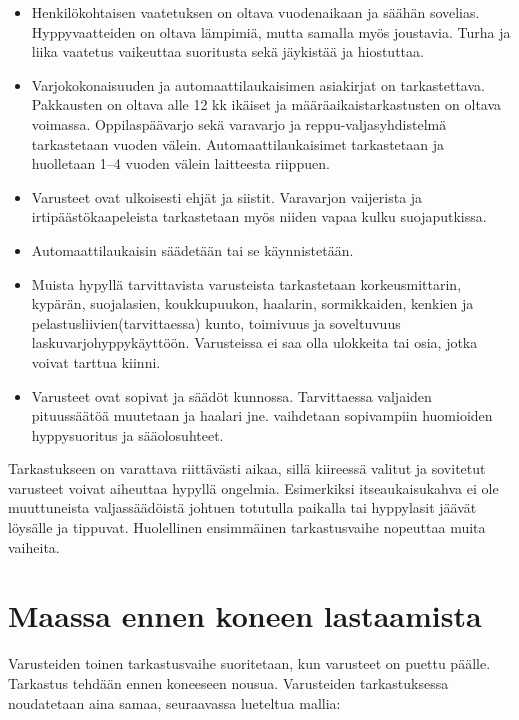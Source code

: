 \begin{itemize}
\item  Henkilökohtaisen vaatetuksen on oltava vuodenaikaan ja säähän sovelias. Hyppyvaatteiden on oltava lämpimiä, mutta samalla myös joustavia. Turha ja liika vaatetus vaikeuttaa suoritusta sekä jäykistää ja hiostuttaa. 
\item  Varjokokonaisuuden ja automaattilaukaisimen asiakirjat on tarkastettava. Pakkausten on oltava alle 12 kk ikäiset ja määräaikaistarkastusten on oltava voimassa. Oppilaspäävarjo sekä varavarjo ja reppu-valjasyhdistelmä tarkastetaan vuoden välein. Automaattilaukaisimet tarkastetaan ja huolletaan 1–4 vuoden välein laitteesta riippuen. 
\item  Varusteet ovat ulkoisesti ehjät ja siistit. Varavarjon vaijerista ja irtipäästökaapeleista tarkastetaan myös niiden vapaa kulku suojaputkissa. 
\item  Automaattilaukaisin säädetään tai se käynnistetään. 
\item  Muista hypyllä tarvittavista varusteista tarkastetaan korkeusmittarin, kypärän, suojalasien, koukkupuukon, haalarin, sormikkaiden, kenkien ja pelastusliivien(tarvittaessa) kunto, toimivuus ja soveltuvuus laskuvarjohyppykäyttöön. Varusteissa ei saa olla ulokkeita tai osia, jotka voivat tarttua kiinni. 
\item  Varusteet ovat sopivat ja säädöt kunnossa. Tarvittaessa valjaiden pituussäätöä muutetaan ja haalari jne. vaihdetaan sopivampiin huomioiden hyppysuoritus ja sääolosuhteet. 
\end{itemize}

Tarkastukseen on varattava riittävästi aikaa, sillä kiireessä valitut ja sovitetut varusteet voivat aiheuttaa hypyllä ongelmia. Esimerkiksi itseaukaisukahva ei ole muuttuneista valjassäädöistä johtuen totutulla paikalla tai hyppylasit jäävät löysälle ja tippuvat. Huolellinen ensimmäinen tarkastusvaihe nopeuttaa muita vaiheita. 

\section{ Maassa ennen koneen lastaamista }
\label{varusteiden-tarkastus-maassa-ennen-koneen-lastaamista}


Varusteiden toinen tarkastusvaihe suoritetaan, kun varusteet on puettu päälle. Tarkastus tehdään ennen koneeseen nousua. Varusteiden tarkastuksessa noudatetaan aina samaa, seuraavassa lueteltua mallia: 

